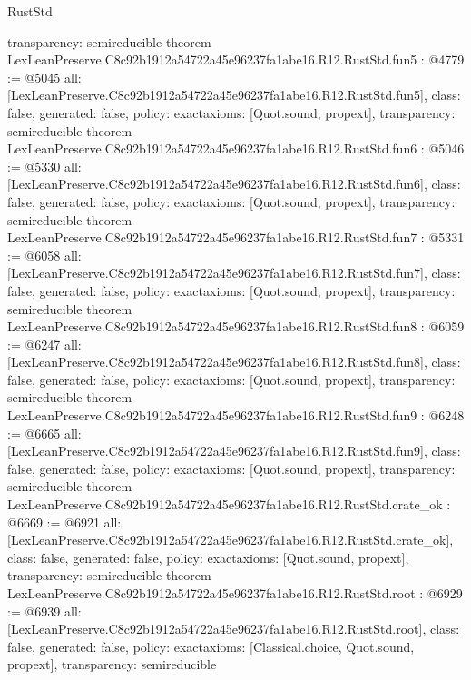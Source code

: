 \begin{lexlean}{RustStd}
\begin{coremodule}
{  transparency: semireducible
}
theorem LexLeanPreserve.C8c92b1912a54722a45e96237fa1abe16.R12.RustStd.fun5 : @4779 := @5045 {
  all: [LexLeanPreserve.C8c92b1912a54722a45e96237fa1abe16.R12.RustStd.fun5],
  class: false,
  generated: false,
  policy: exact{axioms: [Quot.sound, propext]},
  transparency: semireducible
}
theorem LexLeanPreserve.C8c92b1912a54722a45e96237fa1abe16.R12.RustStd.fun6 : @5046 := @5330 {
  all: [LexLeanPreserve.C8c92b1912a54722a45e96237fa1abe16.R12.RustStd.fun6],
  class: false,
  generated: false,
  policy: exact{axioms: [Quot.sound, propext]},
  transparency: semireducible
}
theorem LexLeanPreserve.C8c92b1912a54722a45e96237fa1abe16.R12.RustStd.fun7 : @5331 := @6058 {
  all: [LexLeanPreserve.C8c92b1912a54722a45e96237fa1abe16.R12.RustStd.fun7],
  class: false,
  generated: false,
  policy: exact{axioms: [Quot.sound, propext]},
  transparency: semireducible
}
theorem LexLeanPreserve.C8c92b1912a54722a45e96237fa1abe16.R12.RustStd.fun8 : @6059 := @6247 {
  all: [LexLeanPreserve.C8c92b1912a54722a45e96237fa1abe16.R12.RustStd.fun8],
  class: false,
  generated: false,
  policy: exact{axioms: [Quot.sound, propext]},
  transparency: semireducible
}
theorem LexLeanPreserve.C8c92b1912a54722a45e96237fa1abe16.R12.RustStd.fun9 : @6248 := @6665 {
  all: [LexLeanPreserve.C8c92b1912a54722a45e96237fa1abe16.R12.RustStd.fun9],
  class: false,
  generated: false,
  policy: exact{axioms: [Quot.sound, propext]},
  transparency: semireducible
}
theorem LexLeanPreserve.C8c92b1912a54722a45e96237fa1abe16.R12.RustStd.crate_ok : @6669 := @6921 {
  all: [LexLeanPreserve.C8c92b1912a54722a45e96237fa1abe16.R12.RustStd.crate_ok],
  class: false,
  generated: false,
  policy: exact{axioms: [Quot.sound, propext]},
  transparency: semireducible
}
theorem LexLeanPreserve.C8c92b1912a54722a45e96237fa1abe16.R12.RustStd.root : @6929 := @6939 {
  all: [LexLeanPreserve.C8c92b1912a54722a45e96237fa1abe16.R12.RustStd.root],
  class: false,
  generated: false,
  policy: exact{axioms: [Classical.choice, Quot.sound, propext]},
  transparency: semireducible
}


\end{coremodule}
\end{lexlean}
